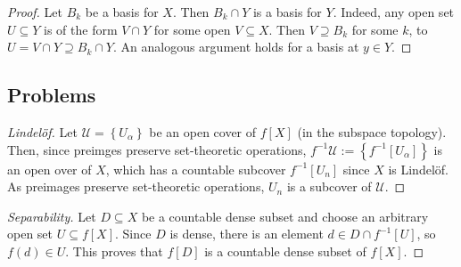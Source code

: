 \begin{proof}
    Let \( B_k \) be a basis for \( X \). Then \( B_k \cap Y \) is a basis for \( Y \). Indeed, any open set \( U \subseteq Y \) is of the form \( V \cap Y \) for some open \( V \subseteq X \). Then \( V \supseteq B_k \) for some \( k \), to \( U = V \cap Y \supseteq B_k \cap Y \). An analogous argument holds for a basis at \( y \in Y \).
\end{proof}

\subsection{Problems}


\begin{proof}[Lindel\"of]
    Let \( \mathcal{U} = \left\{ U_\alpha \right\} \) be an open cover of \( f[X] \) (in the subspace topology). Then, since preimges preserve set-theoretic operations, \( f^{-1} \mathcal{U} := \left\{ f^{-1}[U_\alpha] \right\} \) is an open over of \( X \), which has a countable subcover \( f^{-1}[U_n] \) since \( X \) is Lindel\"of. As preimages preserve set-theoretic operations, \( U_n \) is a subcover of \( \mathcal{U} \).
\end{proof}

\begin{proof}[Separability]
    Let \( D \subseteq X\) be a countable dense subset and choose an arbitrary open set \( U \subseteq f[X] \). Since \( D \) is dense, there is an element \( d \in D \cap f^{-1}[U] \), so \( f(d) \in U \). This proves that \( f[D] \) is a countable dense subset of \( f[X] \).
\end{proof}


